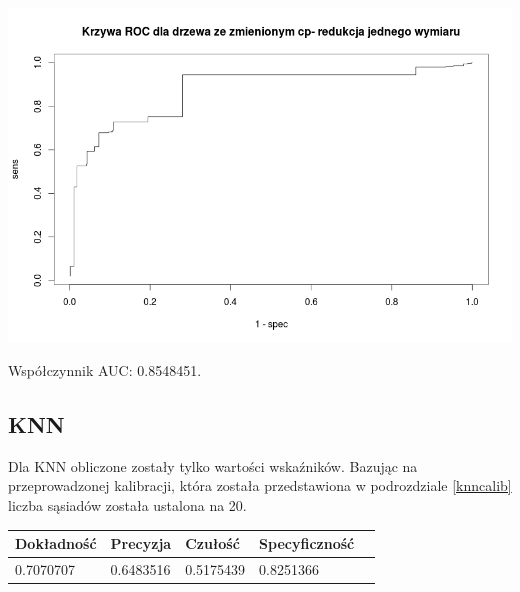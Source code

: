 \documentclass{article}
\begin{document}
\begin{center}
	\includegraphics[scale=0.40]{images/cptree2.png}
\end{center}

Współczynnik AUC: 0.8548451.

\subsection{KNN}

Dla KNN obliczone zostały tylko wartości wskaźników. Bazując na przeprowadzonej kalibracji, która została przedstawiona w podrozdziale \ref{knncalib} liczba sąsiadów została ustalona na 20.\\

\begin{center}
    \begin{tabular}{| l | l | l | l | l|}
    \hline
        Dokładność &  Precyzja &  Czułość & Specyficzność \\ \hline
      	0.7070707 & 0.6483516 & 0.5175439 & 0.8251366  \\
    \hline
    \end{tabular}
\end{center}
\end{document}
